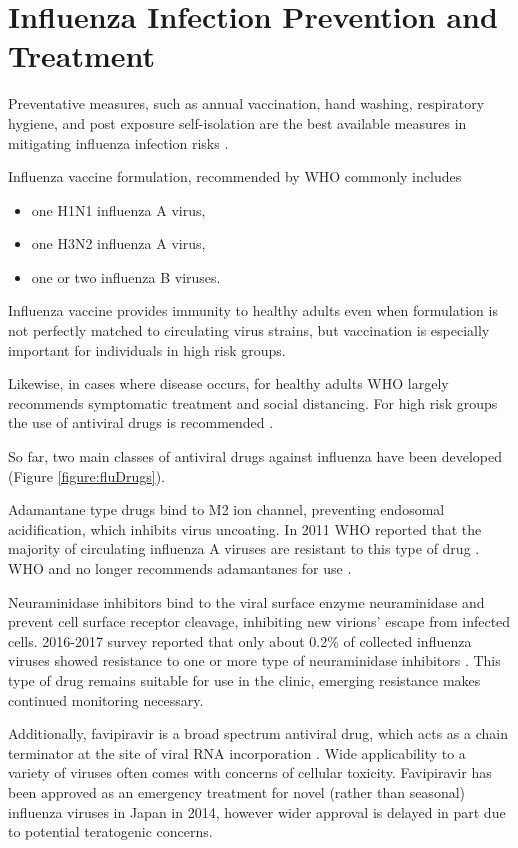 \section{Influenza Infection Prevention and Treatment}

Preventative measures, such as annual vaccination, hand washing, respiratory hygiene, and post exposure self-isolation are the best available measures in mitigating influenza infection risks \cite{influenza_seasonal_2018}.

Influenza vaccine formulation, recommended by WHO commonly includes \cite{RecommendedCompositionVaccines}

\begin{itemize}
    \item one H1N1 influenza A virus,
    \item one H3N2 influenza A virus,
    \item one or two influenza B viruses.
\end{itemize}

Influenza vaccine provides immunity to healthy adults even when formulation is not perfectly matched to circulating virus strains, but vaccination is especially important for individuals in high risk groups.

Likewise, in cases where disease occurs, for healthy adults WHO largely recommends symptomatic treatment and social distancing. For high risk groups the use of antiviral drugs is recommended \cite{influenza_seasonal_2018}.

So far, two main classes of antiviral drugs against influenza have been developed (Figure \ref{figure:fluDrugs}).

Adamantane type drugs bind to M2 ion channel, preventing endosomal acidification, which inhibits virus uncoating. In 2011 WHO reported that the majority of circulating influenza A viruses are resistant to this type of drug \cite{whoAntivirals2011}. WHO and no longer recommends adamantanes for use \cite{influenza_seasonal_2018}.

Neuraminidase inhibitors bind to the viral surface enzyme neuraminidase and prevent cell surface receptor cleavage, inhibiting new virions' escape from infected cells. 2016-2017 survey reported that only about 0.2\% of collected influenza viruses showed resistance to one or more type of neuraminidase inhibitors \cite{lackenby2018global}. This type of drug remains suitable for use in the clinic, emerging resistance makes continued monitoring necessary.

Additionally, favipiravir is a broad spectrum antiviral drug, which acts as a chain terminator at the site of viral RNA incorporation \cite{shiraki2020favipiravir}. Wide applicability to a variety of viruses often comes with concerns of cellular toxicity. Favipiravir has been approved as an emergency treatment for novel (rather than seasonal) influenza viruses in Japan in 2014, however wider approval is delayed in part due to potential teratogenic concerns.

